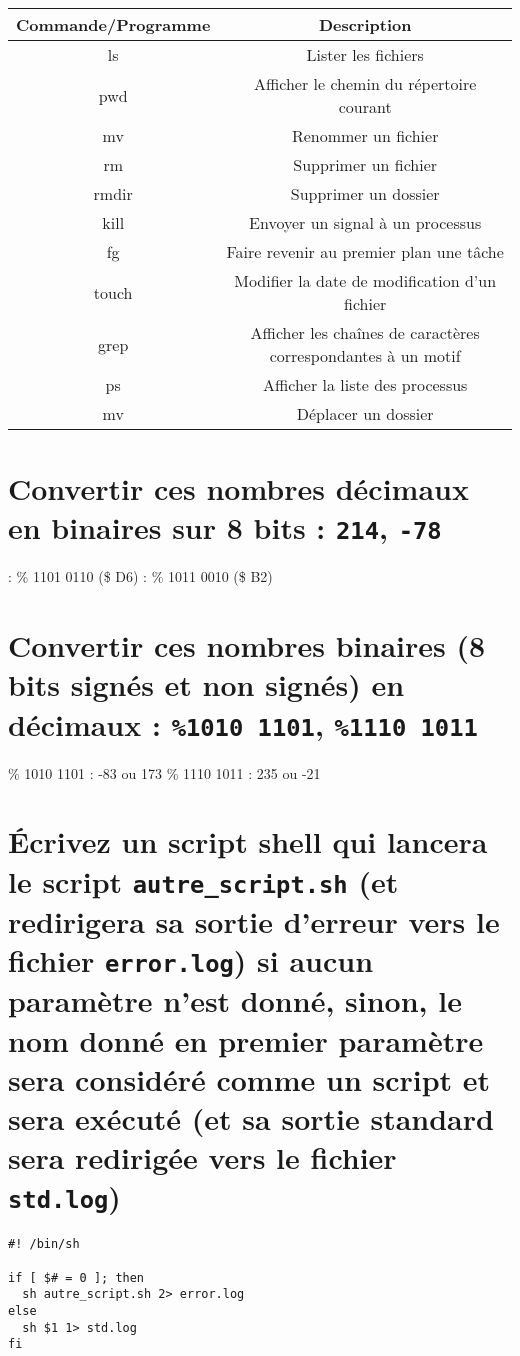 \documentclass[11pt,a4paper]{article}
\newcommand{\TTBF}[1]{\texttt{\textbf{#1}}}
\begin{document}
\bigskip
\begin{center}
  \begin{tabular}{| c | c |}
  \hline
  \textbf{Commande/Programme} & \textbf{Description} \\ \hline
  ls & Lister les fichiers \\ \hline
  pwd & Afficher le chemin du répertoire courant \\ \hline
  mv & Renommer un fichier \\ \hline
  rm & Supprimer un fichier \\ \hline
  rmdir & Supprimer un dossier \\ \hline
  kill & Envoyer un signal à un processus \\ \hline
  fg & Faire revenir au premier plan une tâche \\ \hline
  touch & Modifier la date de modification d'un fichier \\ \hline
  grep & Afficher les chaînes de caractères correspondantes à un motif \\ \hline
  ps & Afficher la liste des processus \\ \hline
  mv & Déplacer un dossier \\
  \hline
  \end{tabular}
\end{center}
\bigskip

\renewcommand\arraystretch{1}

\section{Convertir ces nombres décimaux en binaires sur 8 bits : \texttt{214}, \texttt{-78}}

 : \% 1101 0110 (\$ D6)	 : \% 1011 0010 (\$ B2)
\bigskip

\section{Convertir ces nombres binaires (8 bits signés et non signés) en décimaux : \texttt{\%1010 1101}, \texttt{\%1110 1011}}

\bigskip
\% 1010 1101 : -83 ou 173	\qquad	\% 1110 1011 : 235 ou -21
\bigskip

\section{\'Ecrivez un script shell qui lancera le script \TTBF{autre\_script.sh} (et redirigera sa sortie d'erreur vers le fichier \TTBF{error.log}) si aucun paramètre n'est donné, sinon, le nom donné en premier paramètre sera considéré comme un script et sera exécuté (et sa sortie standard sera redirigée vers le fichier \TTBF{std.log}) }

\bigskip

\begin{verbatim}
#! /bin/sh

if [ $# = 0 ]; then
  sh autre_script.sh 2> error.log
else
  sh $1 1> std.log
fi

\end{verbatim}
\end{document}
